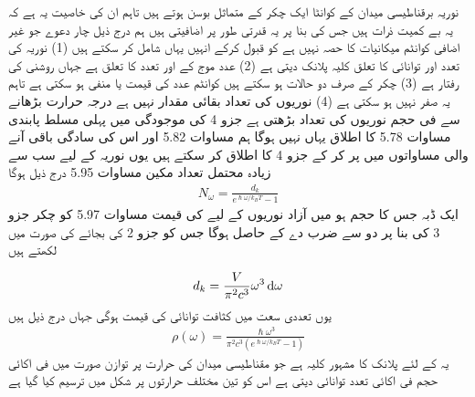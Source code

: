 
نوریہ برقناطیسی میدان کے کوانٹا ایک چکر کے متماثل بوسن ہوتے ہیں تاہم ان کی خاصیت یہ ہے کہ یہ بے کمیت ذرات ہیں جس کی بنا پر یہ قدرتی طور پر اضافیتی ہیں ہم درج ذیل چار دعوے جو غیر اضافی کوانٹم میکانیات کا حصہ نہیں ہے کو قبول کرکے انہیں یہاں شامل کر سکتے ہیں  (1) نوریہ کی تعدد اور توانائی کا تعلق کلیہ پلانک  دیتی ہے  (2) عدد موج کے اور تعدد کا تعلق  ہے جہاں  روشنی کی رفتار ہے  (3) چکر کے صرف دو حالات ہو سکتے ہیں کوانٹم عدد  کی قیمت  یا منفی  ہو سکتی ہے تاہم یہ صفر نہیں ہو سکتی ہے  (4) نوریوں کی تعداد بقائی مقدار نہیں ہے درجہ حرارت بڑھانے سے فی حجم نوریوں کی تعداد بڑھتی ہے  جزو 4 کی موجودگی میں پہلی مسلط پابندی مساوات 5.78 کا اطلاق یہاں نہیں ہوگا ہم مساوات 5.82 اور اس کی سادگی باقی آنے والی مساواتوں میں  پر کر کے جزو 4 کا اطلاق کر سکتے ہیں یوں نوریہ کے لیے سب سے زیادہ محتمل تعداد مکین مساوات 5.95 درج ذیل ہوگا 
\begin{align}
N_{\omega} = \frac{d_k}{e^{\hslash \omega / k_B T} - 1}
\end{align}
ایک ڈبہ جس کا حجم  ہو میں آزاد نوریوں کے لیے  کی قیمت مساوات 5.97 کو چکر جزو 3 کی بنا پر دو سے ضرب دے کے حاصل ہوگا جس کو  جزو 2 کی بجائے  کی صورت میں لکھتے ہیں 

\begin{align} 
d_k = \frac{V}{\pi^2 c^3} \omega^3 \dif  \omega
\end{align}
یوں تعددی سعت   میں کثافت توانائی  کی قیمت  ہوگی جہاں  درج ذیل ہیں 
\begin{align}
\rho (\omega) = \frac{\hslash \omega^3}{\pi^2 c^3 (e^{\hslash \omega / k_B T} - 1)}
\end{align}
یہ   کے لئے پلانک کا مشہور کلیہ ہے جو مقناطیسی میدان کی حرارت  پر توازن صورت میں فی اکائی حجم فی اکائی تعدد توانائی دیتی ہے اس کو تین مختلف حرارتوں پر شکل  میں ترسیم کیا گیا ہے 

